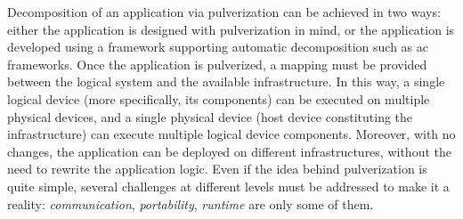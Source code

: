 \documentclass[12pt,a4paper]{article}
\begin{document}
%
Decomposition of an application via pulverization can be achieved in two ways:
either the application is designed with pulverization in mind,
or the application is developed using a framework supporting automatic decomposition such as \ac{ac} frameworks.
%
Once the application is pulverized,
a mapping must be provided between the logical system and the available infrastructure.
%
In this way,
a single logical device (more specifically, its components) can be executed on multiple physical devices,
and a single physical device (host device constituting the infrastructure) can execute multiple logical device components.
%
Moreover,
with no changes,
the application can be deployed on different infrastructures,
without the need to rewrite the application logic.
%
Even if the idea behind pulverization is quite simple,
several challenges at different levels must be addressed to make it a reality:
\emph{communication}, \emph{portability}, \emph{runtime} are only some of them.


\newpage

\end{document}
